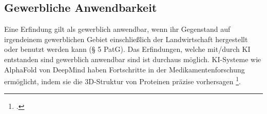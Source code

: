 \subsection{Gewerbliche Anwendbarkeit}
Eine Erfindung gilt als gewerblich anwendbar, 
wenn ihr Gegenstand auf irgendeinem gewerblichen
Gebiet einschließlich der Landwirtschaft hergestellt 
oder benutzt werden kann (§ 5 PatG).
Das Erfindungen, 
welche mit/durch KI entstanden sind gewerblich anwendbar sind ist durchaus möglich.
KI-Systeme wie AlphaFold von DeepMind haben Fortschritte 
in der Medikamentenforschung ermöglicht, 
indem sie die 3D-Struktur von Proteinen präzise vorhersagen \footcite{AlphaFold2024}.
\\




